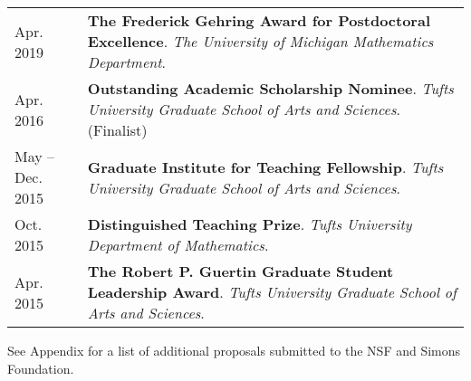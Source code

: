     \vspace{-1em}
    
    \medskip


    \medskip
    
    \begin{center}
    {
    \renewcommand{\arraystretch}{1.5}
    \begin{longtable}{p{}  p{}}
     Apr.  2019 & \textbf{The Frederick Gehring Award for Postdoctoral Excellence}. \textit{The University of Michigan Mathematics Department}.  \\ 
 Apr.  2016 & \textbf{Outstanding Academic Scholarship Nominee}. \textit{Tufts University Graduate School of Arts and Sciences}. (Finalist) \\ 
 May  --  Dec.  2015 & \textbf{Graduate Institute for Teaching Fellowship}. \textit{Tufts University Graduate School of Arts and Sciences}.  \\ 
 Oct.  2015 & \textbf{Distinguished Teaching Prize}. \textit{Tufts University Department of Mathematics}.  \\ 
 Apr.  2015 & \textbf{The Robert P. Guertin Graduate Student Leadership Award}. \textit{Tufts University Graduate School of Arts and Sciences}.  
    \end{longtable}
    } 
    \end{center}

    \vspace{-1em}
    

See Appendix for a list of additional proposals submitted to the NSF and
Simons Foundation.

    